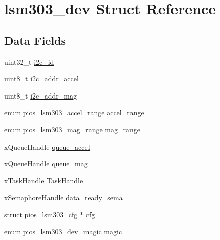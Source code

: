 \hypertarget{structlsm303__dev}{\section{lsm303\-\_\-dev \-Struct \-Reference}
\label{structlsm303__dev}
}
\subsection*{\-Data \-Fields}
\begin{DoxyCompactItemize}
\item 
uint32\-\_\-t \hyperlink{structlsm303__dev_a30d3092e0b3541399e2901bf71a0e6c2}{i2c\-\_\-id}
\item 
uint8\-\_\-t \hyperlink{structlsm303__dev_a43a431687ad3d1280504751dd67b99ad}{i2c\-\_\-addr\-\_\-accel}
\item 
uint8\-\_\-t \hyperlink{structlsm303__dev_a43b3cb1f2405df34e8542d968e9eb321}{i2c\-\_\-addr\-\_\-mag}
\item 
enum \hyperlink{group___p_i_o_s___l_s_m303_gafbb0e59427f40a8d9b0e901af02bb7b3}{pios\-\_\-lsm303\-\_\-accel\-\_\-range} \hyperlink{structlsm303__dev_a925acad41a5880d09927a1d63130e055}{accel\-\_\-range}
\item 
enum \hyperlink{group___p_i_o_s___l_s_m303_ga24737af5b503329ca628b921e32ec8d8}{pios\-\_\-lsm303\-\_\-mag\-\_\-range} \hyperlink{structlsm303__dev_a9c4089c3f5674a6fc5d51d06d90501cc}{mag\-\_\-range}
\item 
x\-Queue\-Handle \hyperlink{structlsm303__dev_aadc09417d06ef07b4f4eb39b74f947a0}{queue\-\_\-accel}
\item 
x\-Queue\-Handle \hyperlink{structlsm303__dev_a4801df95b04cdb58185c818dca8ae4ef}{queue\-\_\-mag}
\item 
x\-Task\-Handle \hyperlink{structlsm303__dev_aa53f45353583c54556c8fd920144726a}{\-Task\-Handle}
\item 
x\-Semaphore\-Handle \hyperlink{structlsm303__dev_ab14a7b6518eb1699835c6d284425a6bb}{data\-\_\-ready\-\_\-sema}
\item 
struct \hyperlink{structpios__lsm303__cfg}{pios\-\_\-lsm303\-\_\-cfg} $\ast$ \hyperlink{structlsm303__dev_ad5dc8f3a8d9729f36b59e641a907c232}{cfg}
\item 
enum \hyperlink{group___p_i_o_s___l_s_m303_ga541e751cf6c930fc56ab31e10b857a74}{pios\-\_\-lsm303\-\_\-dev\-\_\-magic} \hyperlink{structlsm303__dev_a70f59374a7f9e9a6297167795f5b8bdf}{magic}
\end{DoxyCompactItemize}


